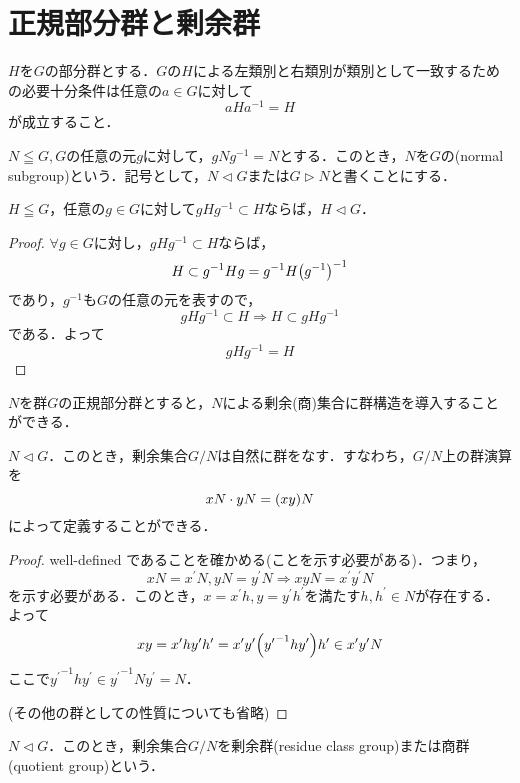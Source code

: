 \documentclass[main]{subfiles}
\begin{document}
\section{正規部分群と剰余群}
	\begin{prop}
		$H$を$G$の部分群とする．$G$の$H$による左類別と右類別が類別として一致するための必要十分条件は任意の$a\in G$に対して
		\[aHa^{-1}=H\]
		が成立すること．
	\end{prop}
	\begin{dfn}[正規部分群]
		$N\leqq G, G$の任意の元$g$に対して，$gNg^{-1}=N$とする．このとき，$N$を$G$の(normal subgroup)という．記号として，$N\triangleleft G$または$G\triangleright N$と書くことにする．
	\end{dfn}
	\begin{prop}
		$H\leqq G$，任意の$g\in G$に対して$gHg^{-1}\subset H$ならば，$H\triangleleft G$．
	\end{prop}
	\begin{proof}
		$\forall g\in G$に対し，$gHg^{-1}\subset H$ならば，
		\[H\subset g^{-1}Hg=g^{-1}H\qty(g^{-1})^{-1}\]
		であり，$g^{-1}$も$G$の任意の元を表すので，
		\[gHg^{-1}\subset H\Rightarrow H\subset gHg^{-1}\]
		である．よって
		\[gHg^{-1}=H\]
	\end{proof}
	\begin{screen}
		$N$を群$G$の正規部分群とすると，$N$による剰余(商)集合に群構造を導入することができる．
	\end{screen}
	\begin{prop}
		$N\triangleleft G$．このとき，剰余集合$G/N$は自然に群をなす．すなわち，$G/N$上の群演算を
		\[xN\cdot yN=\qty(xy)N\]
		によって定義することができる．
	\end{prop}
	\begin{proof}
		well-defined であることを確かめる(ことを示す必要がある)．つまり，
		\[xN=x^\prime N,yN=y^\prime N\Rightarrow xyN=x^\prime y^\prime N\]
		を示す必要がある．このとき，$x=x^\prime h, y=y^\prime h^\prime$を満たす$h,h^\prime\in N$が存在する．よって
		\[xy=x^\prime hy^\prime h^\prime=x^\prime y^\prime\qty({y^{\prime}}^{-1}hy^\prime)h^\prime\in x^\prime y^\prime N\]
		ここで${y^\prime}^{-1}hy^\prime\in {y^\prime}^{-1}Ny^\prime=N$．

		(その他の群としての性質についても省略)
	\end{proof}
	\begin{dfn}
		$N\triangleleft G$．このとき，剰余集合$G/N$を剰余群(residue class group)または商群(quotient group)という．
	\end{dfn}
\end{document}
